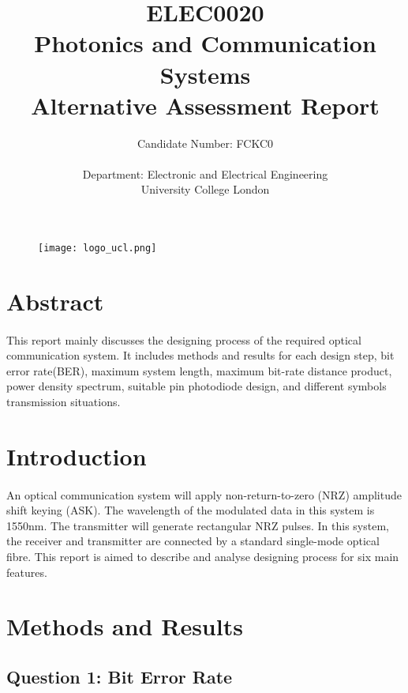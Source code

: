 \documentclass[12pt]{article}
\title{ELEC0020 \\Photonics and Communication Systems\\Alternative Assessment Report}
\author{Candidate Number: FCKC0 \\ \\Department: Electronic and Electrical Engineering \\ University College London}
\begin{document}
    \begin{figure}[t] %
    \centering
    \texttt{[image: logo\_ucl.png]}
    \end{figure}
    \maketitle
    \thispagestyle{empty}
    
    
    
    \newpage
    \tableofcontents
    \thispagestyle{empty}
    \setcounter{page}{0}
    
    \newpage
    \pagestyle{plain}
    \section{Abstract}
    \paragraph{}
   This report mainly discusses the designing process of the required optical communication system. It includes methods and results for each design step, bit error rate(BER), maximum system length, maximum bit-rate distance product, power density spectrum, suitable pin photodiode design, and different symbols transmission situations.
   
    \section{Introduction}
    \paragraph{}
    An optical communication system will apply non-return-to-zero (NRZ) amplitude shift keying (ASK). The wavelength of the modulated data in this system is 1550nm. The transmitter will generate rectangular NRZ pulses. In this system, the receiver and transmitter are connected by a standard single-mode optical fibre. This report is aimed to describe and analyse designing process for six main features.
    
    
    
    \section{Methods and Results}
    
    \subsection{Question 1: Bit Error Rate}
\end{document}
